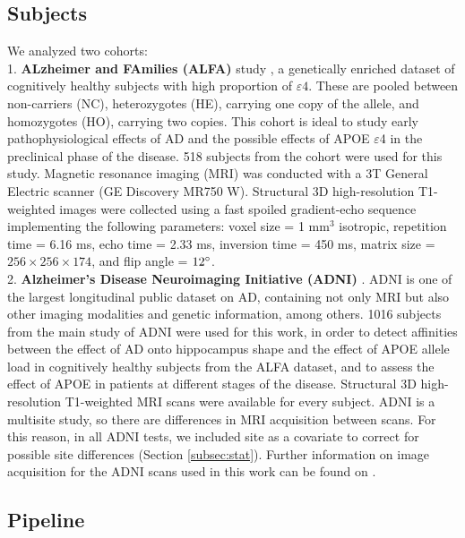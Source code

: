 \subsection{Subjects}

We analyzed two cohorts: \\

1. \textbf{ALzheimer and FAmilies (ALFA)} study \cite{Molinuevo2016}, a genetically enriched dataset of cognitively healthy subjects with high proportion of $\varepsilon4$. These are pooled between non-carriers (NC), heterozygotes (HE), carrying one copy of the allele, and homozygotes (HO), carrying two copies. This cohort is ideal to study early pathophysiological effects of AD and the possible effects of APOE $\varepsilon$4 in the preclinical phase of the disease. 518 subjects from the cohort were used for this study. Magnetic resonance imaging (MRI) was conducted with a 3T General Electric scanner (GE Discovery MR750 W). Structural 3D high-resolution T1-weighted images were collected using a fast spoiled gradient-echo sequence implementing the following parameters: voxel size = 1 mm$^3$ isotropic, repetition time = 6.16 ms, echo time = 2.33 ms, inversion time = 450 ms, matrix size = $256 \times 256 \times 174$, and flip angle = $12\degree$. \\

2. \textbf{Alzheimer's Disease Neuroimaging Initiative (ADNI)} \cite{Mueller2005a}. ADNI is one of the largest longitudinal public dataset on AD, containing not only MRI but also other imaging modalities and genetic information, among others. 1016 subjects from the main study of ADNI were used for this work, in order to detect affinities between the effect of AD onto hippocampus shape and the effect of APOE allele load in cognitively healthy subjects from the ALFA dataset, and to assess the effect of APOE in patients at different stages of the disease. Structural 3D high-resolution T1-weighted MRI scans were available for every subject. ADNI is a multisite study, so there are differences in MRI acquisition between scans. For this reason, in all ADNI tests, we included site as a covariate to correct for possible site differences (Section \ref{subsec:stat}). Further information on image acquisition for the ADNI scans used in this work can be found on \cite{Jack2010}. \\

\subsection{Pipeline}
\label{sec:pipeline}


